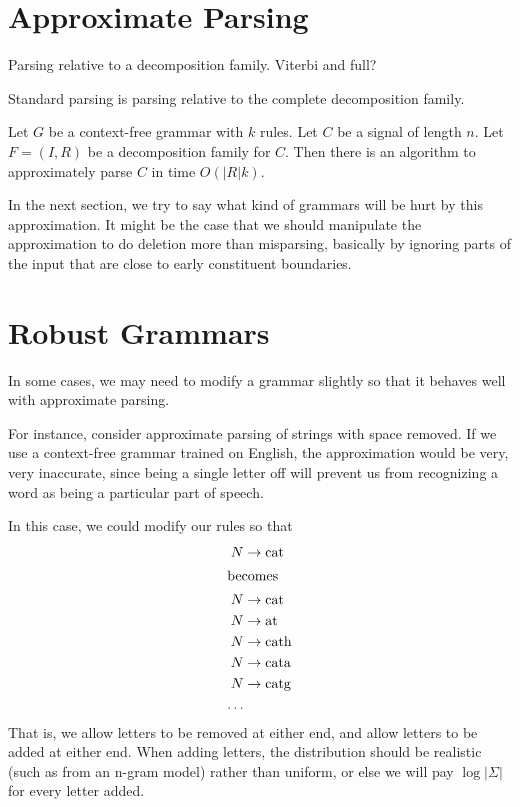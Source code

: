 \documentclass{article}
\begin{document}
\section{Approximate Parsing}


\begin{defn}
Parsing relative to a decomposition family. Viterbi and full?
\end{defn}

Standard parsing is parsing relative to the complete decomposition
family.

\begin{thm}
Let $G$ be a context-free grammar with $k$ rules. Let $C$ be a signal
of length $n$. Let $F=(I,R)$ be a decomposition family for $C$. Then
there is an algorithm to approximately parse $C$ in time $O(|R|k)$.
\end{thm}

In the next section, we try to say what kind of grammars will be hurt
by this approximation. It might be the case that we should manipulate
the approximation to do deletion more than misparsing, basically by
ignoring parts of the input that are close to early constituent
boundaries.

\section{Robust Grammars}

In some cases, we may need to modify a grammar slightly so that it
behaves well with approximate parsing.

For instance, consider approximate parsing of strings with space
removed. If we use a context-free grammar trained on English, the
approximation would be very, very inaccurate, since being a single
letter off will prevent us from recognizing a word as being a
particular part of speech.

In this case, we could modify our rules so that
\begin{align*}
N &\to \mbox{cat} \\
\intertext{becomes}
N &\to \mbox{cat} \\
N &\to \mbox{at} \\
N &\to \mbox{cath} \\
N &\to \mbox{cata} \\
N &\to \mbox{catg} \\
\ldots
\end{align*}
That is, we allow letters to be removed at either end, and allow
letters to be added at either end. When adding letters, the
distribution should be realistic (such as from an n-gram model) rather
than uniform, or else we will pay $\log|\Sigma|$ for every letter
added.
\end{document}
